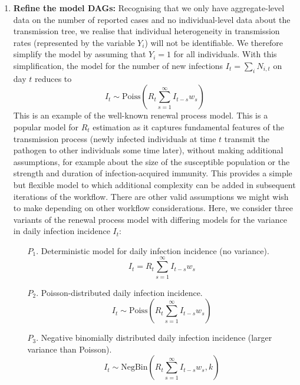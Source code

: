 \documentclass{article}
\begin{document}
\begin{enumerate}
\item \textbf{Refine the model DAGs:} Recognising that we only have aggregate-level data on the number of reported cases and no individual-level data about the transmission tree, we realise that individual heterogeneity in transmission rates (represented by the variable $Y_i$) will not be identifiable. We therefore simplify the model by assuming that $Y_i=1$ for all individuals. With this simplification, the model for the number of new infections $I_t=\sum_i N_{i,t}$ on day $t$ reduces to
    \begin{equation} 
        I_t \sim \mathrm{Poiss}\left( R_t \sum_{s=1}^\infty I_{t-s}w_s  \right)
    \end{equation}
    This is an example of the well-known renewal process model. This is a popular model for $R_t$ estimation as it captures fundamental features of the transmission process (newly infected individuals at time $t$ transmit the pathogen to other individuals some time later), without making additional assumptions, for example about the size of the susceptible population or the strength and duration of infection-acquired immunity. This provides a simple but flexible model to which additional complexity can be added in subsequent iterations of the workflow.
    There are other valid assumptions we might wish to make depending on other workflow considerations. Here, we consider three variants of the renewal process model with differing models for the variance in daily infection incidence $I_t$:
    \begin{itemize}
    \item[$P_1$.] Deterministic model for daily infection incidence (no variance).
    \begin{equation} \label{eq:infections_P1}
        I_t = R_t \sum_{s=1}^\infty I_{t-s}w_s 
    \end{equation}
    \item[$P_2$.] Poisson-distributed daily infection incidence.
        \begin{equation} \label{eq:infections_P2}
        I_t \sim \mathrm{Poiss}\left( R_t \sum_{s=1}^\infty I_{t-s}w_s  \right)
    \end{equation}
    \item[$P_3$.] Negative binomially distributed daily infection incidence (larger variance than Poisson). 
            \begin{equation} \label{eq:infections_P3}
        I_t \sim \mathrm{NegBin}\left( R_t \sum_{s=1}^\infty I_{t-s}w_s, k  \right)
    \end{equation}

\end{itemize}
\end{enumerate}
\end{document}
